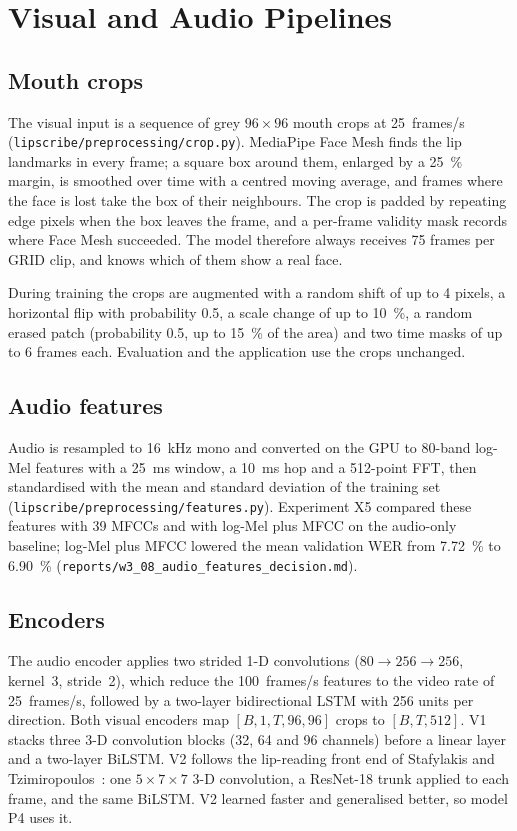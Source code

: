 \section{Visual and Audio Pipelines}
\label{sec:pipelines}

\subsection{Mouth crops}
The visual input is a sequence of grey $96 \times 96$ mouth crops at 25~frames/s
(\texttt{lipscribe/preprocessing/crop.py}). MediaPipe Face Mesh finds the lip landmarks in every
frame; a square box around them, enlarged by a 25~\% margin, is smoothed over time with a
centred moving average, and frames where the face is lost take the box of their neighbours.
The crop is padded by repeating edge pixels when the box leaves the frame, and a per-frame
validity mask records where Face Mesh succeeded. The model therefore always receives 75 frames
per GRID clip, and knows which of them show a real face.

During training the crops are augmented with a random shift of up to 4 pixels, a horizontal
flip with probability 0.5, a scale change of up to 10~\%, a random erased patch (probability
0.5, up to 15~\% of the area) and two time masks of up to 6 frames each. Evaluation and the
application use the crops unchanged.

\subsection{Audio features}
Audio is resampled to 16~kHz mono and converted on the GPU to 80-band log-Mel features with a
25~ms window, a 10~ms hop and a 512-point FFT, then standardised with the mean and standard
deviation of the training set (\texttt{lipscribe/preprocessing/features.py}). Experiment X5
compared these features with 39 MFCCs and with log-Mel plus MFCC on the audio-only baseline;
log-Mel plus MFCC lowered the mean validation WER from 7.72~\% to 6.90~\%
(\texttt{reports/w3\_08\_audio\_features\_decision.md}).

\subsection{Encoders}
The audio encoder applies two strided 1-D convolutions ($80 \rightarrow 256 \rightarrow 256$,
kernel~3, stride~2), which reduce the 100~frames/s features to the video rate of 25~frames/s,
followed by a two-layer bidirectional LSTM with 256 units per direction. Both visual encoders
map $[B, 1, T, 96, 96]$ crops to $[B, T, 512]$. V1 stacks three 3-D convolution blocks (32, 64
and 96 channels) before a linear layer and a two-layer BiLSTM. V2 follows the lip-reading
front end of Stafylakis and Tzimiropoulos~\cite{stafylakis2017}: one $5 \times 7 \times 7$ 3-D
convolution, a ResNet-18 trunk applied to each frame, and the same BiLSTM. V2 learned faster
and generalised better, so model P4 uses it.

